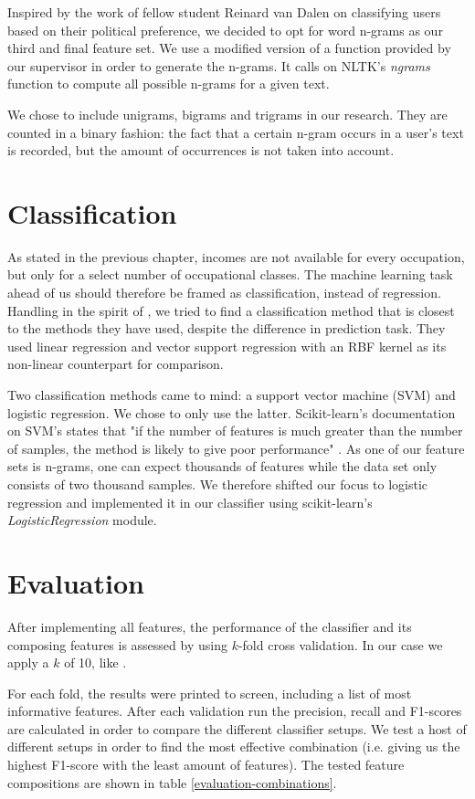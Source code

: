 \documentclass[
10pt, %
a4paper, %
oneside, %
headinclude,footinclude, %
] {book}%
\begin{document}
Inspired by the work of fellow student Reinard van Dalen on classifying users based on their political preference, we decided to opt for word n-grams as our third and final feature set. We use a modified version of a function provided by our supervisor in order to generate the n-grams. It calls on NLTK's \textit{ngrams} function to compute all possible n-grams for a given text.

We chose to include unigrams, bigrams and trigrams in our research. They are counted in a binary fashion: the fact that a certain n-gram occurs in a user's text is recorded, but the amount of occurrences is not taken into account.

\section{Classification}
As stated in the previous chapter, incomes are not available for every occupation, but only for a select number of occupational classes. The machine learning task ahead of us should therefore be framed as classification, instead of regression.
Handling in the spirit of \citet{flekova}, we tried to find a classification method that is closest to the methods they have used, despite the difference in prediction task. They used linear regression and vector support regression with an RBF kernel as its non-linear counterpart for comparison. 

Two classification methods came to mind: a support vector machine (SVM) and logistic regression. We chose to only use the latter. Scikit-learn's documentation on SVM's states that "if the number of features is much greater than the number of samples, the method is likely to give poor performance" \citep{svm}.
As one of our feature sets is n-grams, one can expect thousands of features while the data set only consists of two thousand samples. We therefore shifted our focus to logistic regression and implemented it in our classifier using scikit-learn's \textit{LogisticRegression} module.

\section{Evaluation}
After implementing all features, the performance of the classifier and its composing features is assessed by using $k$-fold cross validation. In our case we apply a $k$ of 10, like \citet{flekova}.

For each fold, the results were printed to screen, including a list of most informative features. After each validation run the precision, recall and F1-scores are calculated in order to compare the different classifier setups. We test a host of different setups in order to find the most effective combination (i.e. giving us the highest F1-score with the least amount of features).  The tested feature compositions are shown in table \ref{evaluation-combinations}.
\end{document}
